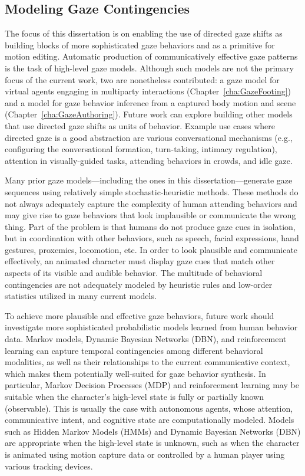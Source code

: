 \subsection{Modeling Gaze Contingencies}

The focus of this dissertation is on enabling the use of directed gaze shifts as building blocks of more sophisticated gaze behaviors and as a primitive for motion editing. Automatic production of communicatively effective gaze patterns is the task of high-level gaze models. Although such models are not the primary focus of the current work, two are nonetheless contributed: a gaze model for virtual agents engaging in multiparty interactions (Chapter~\ref{cha:GazeFooting}) and a model for gaze behavior inference from a captured body motion and scene (Chapter~\ref{cha:GazeAuthoring}). Future work can explore building other models that use directed gaze shifts as units of behavior. Example use cases where directed gaze is a good abstraction are various conversational mechanisms (e.g., configuring the conversational formation, turn-taking, intimacy regulation), attention in visually-guided tasks, attending behaviors in crowds, and idle gaze.

Many prior gaze models---including the ones in this dissertation---generate gaze sequences using relatively simple stochastic-heuristic methods. These methods do not always adequately capture the complexity of human attending behaviors and may give rise to gaze behaviors that look implausible or communicate the wrong thing. Part of the problem is that humans do not produce gaze cues in isolation, but in coordination with other behaviors, such as speech, facial expressions, hand gestures, proxemics, locomotion, etc. In order to look plausible and communicate effectively, an animated character must display gaze cues that match other aspects of its visible and audible behavior. The multitude of behavioral contingencies are not adequately modeled by heuristic rules and low-order statistics utilized in many current models.

To achieve more plausible and effective gaze behaviors, future work should investigate more sophisticated probabilistic models learned from human behavior data. Markov models, Dynamic Bayesian Networks (DBN), and reinforcement learning can capture temporal contingencies among different behavioral modalities, as well as their relationships to the current communicative context, which makes them potentially well-suited for gaze behavior synthesis. In particular, Markov Decision Processes (MDP) and reinforcement learning may be suitable when the character's high-level state is fully or partially known (observable). This is usually the case with autonomous agents, whose attention, communicative intent, and cognitive state are computationally modeled. Models such as Hidden Markov Models (HMMs) and Dynamic Bayesian Networks (DBN) are appropriate when the high-level state is unknown, such as when the character is animated using motion capture data or controlled by a human player using various tracking devices.

